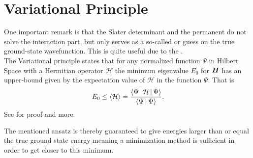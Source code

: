 \section{Variational Principle\label{sec:varPrinc}}
    One important remark is that the Slater determinant and the permanent do
    not solve the interaction part, but only serves as a so-called
     or guess on the true ground-state wavefunction. This is
    quite useful due to the . \\
    The Variational principle states that for any normalized function $\Psi$ in
    Hilbert Space\cite{GriffQuan} with a Hermitian operator $\mathcal{H}$ the
    minimum eigenvalue $E_0$ for $\boldsymbol{{H}}$ has an upper-bound given by the
    expectation value of $\mathcal{H}$ in the function $\Psi$. That is
        \begin{equation}
            E_0 \leq \left< {\mathcal{H}} \right> =
            \frac{\Braket{\Psi|\mathcal{H}|\Psi}}{\Braket{\Psi|\Psi}}. 
            \label{eq:varPrinc}
        \end{equation}
    See \cite{GriffQuan} for proof and more.

    The mentioned ansatz is thereby guaranteed to give energies larger than or
    equal the true ground state energy meaning a minimization method is
    sufficient in order to get closer to this minimum. 
   

